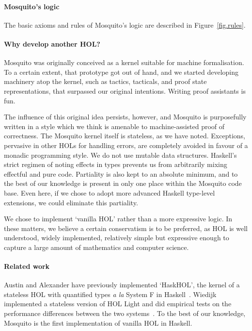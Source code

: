\documentclass{llncs}
\newcommand{\mosquito}{Mosquito\xspace}
\begin{document}
\paragraph{\mosquito's logic}
The basic axioms and rules of \mosquito's logic are described in Figure~\ref{fig.rules}.

\paragraph{Why develop another HOL?}
\mosquito was originally conceived as a kernel suitable for machine formalisation.
To a certain extent, that prototype got out of hand, and we started developing machinery atop the kernel, such as tactics, tacticals, and proof state representations, that surpassed our original intentions.
Writing proof assistants is fun.

The influence of this original idea persists, however, and \mosquito is purposefully written in a style which we think is amenable to machine-assisted proof of correctness.
The \mosquito kernel itself is stateless, as we have noted.
Exceptions, pervasive in other HOLs for handling errors, are completely avoided in favour of a monadic programming style.
We do not use mutable data structures.
Haskell's strict regimen of noting effects in types prevents us from arbitrarily mixing effectful and pure code.
Partiality is also kept to an absolute minimum, and to the best of our knowledge is present in only one place within the \mosquito code base.
Even here, if we chose to adopt more advanced Haskell type-level extensions, we could eliminate this partiality.

We chose to implement `vanilla HOL' rather than a more expressive logic.
In these matters, we believe a certain conservatism is to be preferred, as HOL is well understood, widely implemented, relatively simple but expressive enough to capture a large amount of mathematics and computer science.
\paragraph{Related work}
Austin and Alexander have previously implemented `HaskHOL', the kernel of a stateless HOL with quantified types \emph{a la} System F in Haskell~\cite{austin:stateless:2013}.
Wiedijk implemented a stateless version of HOL Light and did empirical tests on the performance differences between the two systems~\cite{wiedijk:stateless:2011}.
To the best of our knowledge, \mosquito is the first implementation of vanilla HOL in Haskell.
\end{document}
